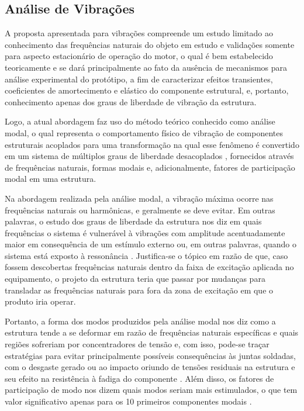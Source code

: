 \subsection{Análise de Vibrações} \label{section:AnaliseVibracoes}
A proposta apresentada para vibrações compreende um estudo limitado ao conhecimento das frequências naturais do objeto em estudo e validações somente para aspecto estacionário de operação do motor, o qual é bem estabelecido teoricamente e se dará principalmente ao fato da ausência de mecanismos para análise experimental do protótipo, a fim de caracterizar efeitos transientes, coeficientes de amortecimento e elástico do componente estrutural, e, portanto, conhecimento apenas dos graus de liberdade de vibração da estrutura.

Logo, a atual abordagem faz uso do método teórico conhecido como análise modal, o qual representa o comportamento físico de vibração de componentes estruturais acoplados para uma transformação na qual esse fenômeno é convertido em um sistema de múltiplos graus de liberdade desacoplados \cite{inmanbook}, fornecidos através de frequências naturais, formas modais e, adicionalmente, fatores de participação modal em uma estrutura.

Na abordagem realizada pela análise modal, a vibração máxima ocorre nas frequências naturais ou harmônicas, e geralmente se deve evitar. Em outras palavras, o estudo dos graus de liberdade da estrutura nos diz em quais frequências o sistema é vulnerável à vibrações com amplitude acentuadamente maior em consequência de um estímulo externo ou, em outras palavras, quando o sistema está exposto à ressonância \cite{inmanbook}. Justifica-se o tópico em razão de que, caso fossem descobertas frequências naturais dentro da faixa de excitação aplicada no equipamento, o projeto da estrutura teria que passar por mudanças para transladar as frequências naturais para fora da zona de excitação em que o produto iria operar.

Portanto, a forma dos modos produzidos pela análise modal nos diz como a estrutura tende a se deformar em razão de frequências naturais específicas e quais regiões sofreriam por concentradores de tensão e, com isso, pode-se traçar estratégias para evitar principalmente possíveis consequências às juntas soldadas, com o desgaste gerado \cite{failure} ou ao impacto oriundo de tensões residuais na estrutura e seu efeito na resistência à fadiga do componente \cite{fatigue}. Além disso, os fatores de participação de modo nos dizem quais modos seriam mais estimulados, o que tem valor significativo apenas para os 10 primeiros componentes modais \cite{inmanbook}.

